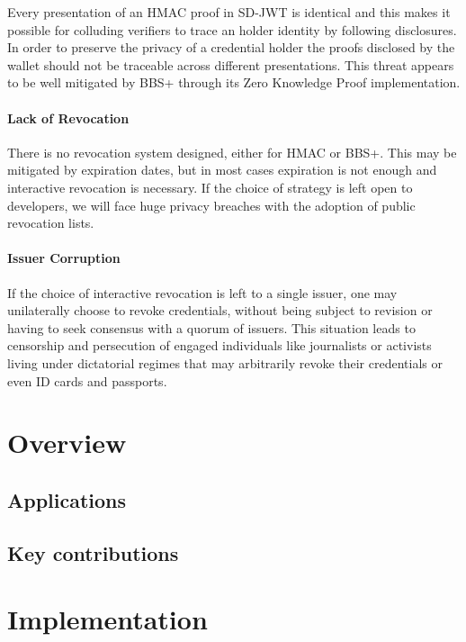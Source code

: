\documentclass[conference]{IEEEtran}
\begin{document}
Every presentation of an HMAC proof in SD-JWT is identical and this makes it possible for colluding verifiers to trace an holder identity by following disclosures. In order to preserve the privacy of a credential holder the proofs disclosed by the wallet should not be traceable across different presentations. This threat appears to be well mitigated by BBS+ through its Zero Knowledge Proof implementation.

\paragraph{Lack of Revocation}

There is no revocation system designed, either for HMAC or BBS+. This may be mitigated by expiration dates, but in most cases expiration is not enough and interactive revocation is necessary. If the choice of strategy is left open to developers, we will face huge privacy breaches with the adoption of public revocation lists.



\paragraph{Issuer Corruption}

If the choice of interactive revocation is left to a single issuer, one may unilaterally choose to revoke credentials, without being subject to revision or having to seek consensus with a quorum of issuers. This situation leads to censorship and persecution of engaged individuals like journalists or activists living under dictatorial regimes that may arbitrarily revoke their credentials or even ID cards and passports.

\section{Overview}

\subsection{Applications}
\subsection{Key contributions}

\section{Implementation}
\end{document}
